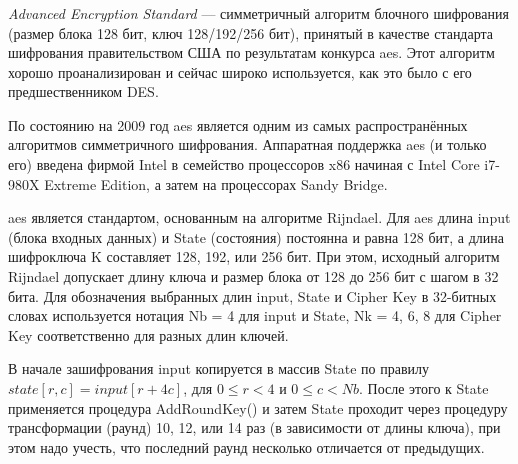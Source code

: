 \subsubsection{}
\label{sec:analysis:research:crypto:aes}

\emph{Advanced Encryption Standard} --- симметричный алгоритм блочного шифрования (размер блока 128 бит, ключ 128/192/256 бит), принятый в качестве стандарта шифрования правительством США по результатам конкурса \gls{aes}. Этот алгоритм хорошо проанализирован и сейчас широко используется, как это было с его предшественником DES\cite{wiki:aes}.

По состоянию на 2009 год \gls{aes} является одним из самых распространённых алгоритмов симметричного шифрования\cite{thg:aes}. Аппаратная поддержка \gls{aes} (и только его) введена фирмой Intel в семейство процессоров x86 начиная с Intel Core i7-980X Extreme Edition, а затем на процессорах Sandy Bridge.

\gls{aes} является стандартом, основанным на алгоритме Rijndael. Для \gls{aes} длина input (блока входных данных) и State (состояния) постоянна и равна 128 бит, а длина шифроключа K составляет 128, 192, или 256 бит. При этом, исходный алгоритм Rijndael допускает длину ключа и размер блока от 128 до 256 бит с шагом в 32 бита. Для обозначения выбранных длин input, State и Cipher Key в 32-битных словах используется нотация Nb = 4 для input и State, Nk = 4, 6, 8 для Cipher Key соответственно для разных длин ключей.

В начале зашифрования input копируется в массив State по правилу \(state[r,c]=input[r+4c]\), для \(0 \leq r < 4\) и \(0 \leq c < Nb\). После этого к State применяется процедура AddRoundKey() и затем State проходит через процедуру трансформации (раунд) 10, 12, или 14 раз (в зависимости от длины ключа), при этом надо учесть, что последний раунд несколько отличается от предыдущих.